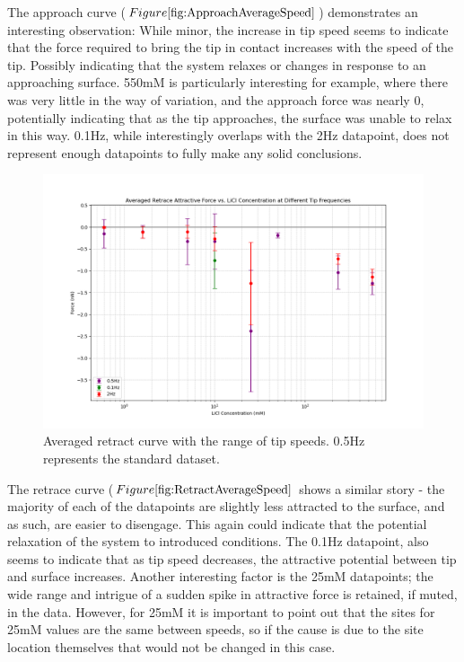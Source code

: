 The approach curve ($Figure \ref{fig:ApproachAverageSpeed}$) demonstrates an interesting observation: While minor, the increase in tip speed seems to indicate that the force required to bring the tip in contact increases with the speed of the tip. Possibly indicating that the system relaxes or changes in response to an approaching surface. 550mM is particularly interesting for example, where there was very little in the way of variation, and the approach force was nearly 0, potentially indicating that as the tip approaches, the surface was unable to relax in this way. 0.1Hz, while interestingly overlaps with the 2Hz datapoint, does not represent enough datapoints to fully make any solid conclusions. 

\begin{figure}[h!]
\centering
\includegraphics[width=\textwidth]{chapter7/Tip speed/Overall graph retrace.png}
\caption{Averaged retract curve with the range of tip speeds. 0.5Hz represents the standard dataset.}
\label{fig:RetractAverageSpeed}
\end{figure}

The retrace curve ($Figure \ref{fig:RetractAverageSpeed}$ shows a similar story - the majority of each of the datapoints are slightly less attracted to the surface, and as such, are easier to disengage. This again could indicate that the potential relaxation of the system to introduced conditions. The 0.1Hz datapoint, also seems to indicate that as tip speed decreases, the attractive potential between tip and surface increases. Another interesting factor is the 25mM datapoints; the wide range and intrigue of a sudden spike in attractive force is retained, if muted, in the data. However, for 25mM it is important to point out that the sites for 25mM values are the same between speeds, so if the cause is due to the site location themselves that would not be changed in this case.

